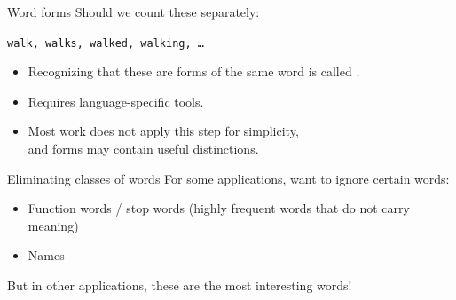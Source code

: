\documentclass[aspectratio=169,usenames,dvipsnames]{beamer}
\begin{document}
% 
% 
% 
% 


\begin{frame}{Word forms}
    Should we count these separately:

    \vspace{1em}
    \texttt{walk, walks, walked, walking, \dots}

    \vspace{1em}
    \begin{itemize}
    \item Recognizing that these are forms of the same word
    is called .

    \item Requires language-specific tools.

    \item Most work does not apply this step for simplicity,\\
        and forms may contain useful distinctions.
    \end{itemize}
\end{frame}

\begin{frame}{Eliminating classes of words}
    For some applications, want to ignore certain words:
    \begin{itemize}
        \item Function words / stop words (highly frequent words that do not carry meaning)
        \item Names
    \end{itemize}

    But in other applications, these are the most interesting words!
\end{frame}
\end{document}
